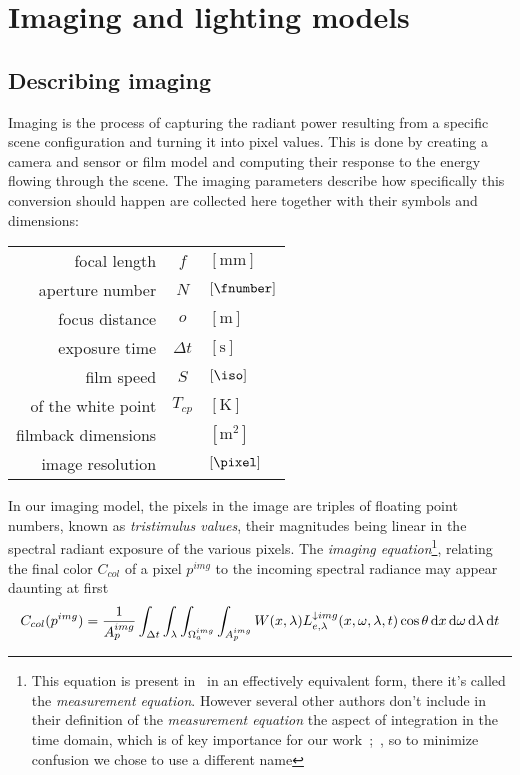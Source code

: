
\chapter{Imaging and lighting models}\label{ch:lighting}
\section{Describing imaging}\label{ch:imaging}

Imaging is the process of capturing the \gls{radiant power} resulting 
from a specific \gls{scene} configuration and turning it into pixel values. 
This is done by creating a camera and sensor or film model and computing 
their response to the energy flowing through the scene.
The imaging parameters describe how specifically this conversion should happen 
are collected here together with their symbols and dimensions:

\vskip 2mm
\begin{center}
\begin{tabular}{r c l}
	focal length        & $f$ & $[\unit{\milli\meter}]$ \\
	aperture number     & $N$ & $[\unit{\fnumber}]$ \\
	focus distance      & $o$ & $[\unit{\meter}]$ \\
	exposure time       & $\Delta t$ & $[\unit{\second}]$ \\
	film speed          & $S$ & $[\unit{\iso}]$ \\
	\glsname{CCT} of the white point & $T_{cp}$ & $[\unit{\kelvin}]$ \\
	filmback dimensions &     & $[\unit{\square\meter}]$ \\
	image resolution    &     & $[\unit{\pixel}]$
\end{tabular}
\end{center}

\vskip 2mm

In our imaging model, the pixels in the image are triples of
floating point numbers, known as \textsl{\gls{tristimulus values}}, their
magnitudes being linear in the spectral radiant \gls{exposure} of the various
pixels. 
The \textsl{\gls{imaging equation}}\footnote{
	This equation is present in~\cite[Eq. 1]{kolb95} in an effectively equivalent form,
	there it's called the \emph{measurement equation}. 
	However several other authors don't include in their definition of the
	\emph{measurement equation} the aspect of integration in the time domain, which is
	of key importance for our work~\cite[p. 45, Eq 2.33]{dutre2003};~\cite{pharr2023}, so to minimize confusion
	we chose to use a different name
}, relating the final color $C_{col}$ of a pixel
$p^{img}$ to the incoming \gls{spectral} \gls{radiance} may appear daunting at first
\begin{equation}\label{eqn:imaging1}
	C_{col}(p^{img})  = \frac1{A_p^{img}}
	\int_{\Delta t} \int_{\lambda} \int_{\Omega^{img}_a} \int_{A_p^{img}}
	  W(x, \lambda) L^{\downarrow
		img}_{e,\lambda}(x, \omega, \lambda, t) \cos\theta\mathop{}\!\mathrm{d} x\mathop{}\!\mathrm{d}\omega\mathop{}\!\mathrm{d}\lambda\mathop{}\!\mathrm{d} t
\end{equation}

